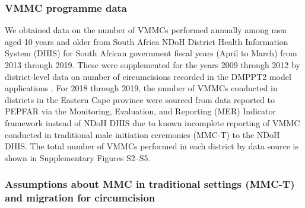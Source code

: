 \documentclass{article}
\begin{document}

\subsubsection*{VMMC programme data}


We obtained data on the number of VMMCs performed annually among men aged 10 years and older from South Africa NDoH District Health Information System (DHIS) for South African government fiscal years (April to March) from 2013 through 2019. These were supplemented for the years 2009 through 2012 by district-level data on number of circumcisions recorded in the DMPPT2 model applications \cite{kripke2016age, kripke2016cost}. For 2018 through 2019, the number of VMMCs conducted in districts in the Eastern Cape province were sourced from data reported to PEPFAR via the Monitoring, Evaluation, and Reporting (MER) Indicator framework instead of NDoH DHIS due to known incomplete reporting of VMMC conducted in traditional male initiation ceremonies (MMC-T) to the NDoH DHIS. The total number of VMMCs performed in each district by data source is shown in Supplementary Figures S2--S5.


\subsubsection*{Assumptions about MMC in traditional settings (MMC-T) and migration for circumcision}

\end{document}

